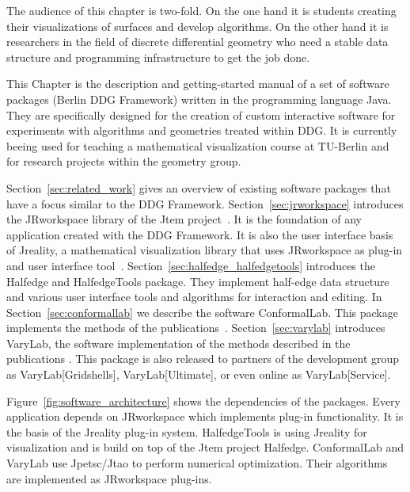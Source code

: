 The audience of this chapter is two-fold. On the one hand it is students creating their 
visualizations of surfaces and develop algorithms. On the other hand it is researchers in the
field of discrete differential geometry who need a stable data structure and programming
infrastructure to get the job done.

This Chapter is the description and getting-started manual of a set of software packages
(Berlin DDG Framework) written in the programming language {\sc Java}. They are 
specifically designed for the creation of
custom interactive software for experiments with algorithms and geometries treated 
within DDG. It is currently beeing used for teaching a mathematical visualization course at 
TU-Berlin \cite{VisMathHomepage} and for research projects within the geometry group.

Section~\ref{sec:related_work} gives an overview of existing software packages that have a focus 
similar to the DDG Framework. Section~\ref{sec:jrworkspace} introduces the {\sc JRworkspace} library of the 
{\sc Jtem} project~\cite{JtemWebsite}. It is the foundation of any application created with 
the DDG Framework. It is also the user interface basis of {\sc Jreality}, a mathematical 
visualization library that uses {\sc JRworkspace} as plug-in and user interface 
tool~\cite{JrealityWebsite}. Section~\ref{sec:halfedge_halfedgetools} introduces the 
{\sc Halfedge} and {\sc HalfedgeTools} package. They implement half-edge data 
structure and various user interface tools and algorithms for interaction and editing.  
In Section~\ref{sec:conformallab} we describe the software 
{\sc ConformalLab}. This package implements the methods of the 
publications~\cite{Bobenko2010, OWR2012, Sechelmann2012, BobSechSpr}.
Section~\ref{sec:varylab} introduces {\sc VaryLab}, the software implementation of the 
methods described in the publications \cite{Lafuente2011, Lafuente2012, Sechelmann2012}.
This package is also released to partners of the development group as {\sc VaryLab[Gridshells]},
{\sc VaryLab[Ultimate]}, or even online as {\sc VaryLab[Service]}\cite{varylab-web-page}.

Figure~\ref{fig:software_architecture} shows the dependencies of the packages. Every
application depends on {\sc JRworkspace} which implements plug-in functionality. It is
the basis of the {\sc Jreality} plug-in system. {\sc Half\-edge\-Tools} is using {\sc Jreality} 
for visualization and is build on top of the {\sc Jtem} project {\sc Half\-edge}. 
{\sc ConformalLab} and {\sc VaryLab} use {\sc Jpetsc/Jtao} to perform numerical
optimization. Their algorithms are implemented as {\sc JRworkspace} plug-ins.

